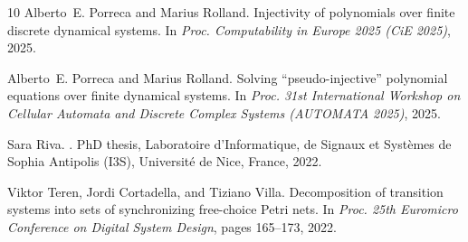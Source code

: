 \documentclass[a4paper, 11pt]{article}
\theoremstyle{plain}
\theoremstyle{definition}
\begin{document}
\begin{thebibliography}{10}
Alberto~E. Porreca and Marius Rolland.
\newblock Injectivity of polynomials over finite discrete dynamical systems.
\newblock In {\em Proc. Computability in Europe 2025 (CiE 2025)}, 2025.

Alberto~E. Porreca and Marius Rolland.
\newblock Solving “pseudo-injective” polynomial equations over finite dynamical systems.
\newblock In {\em Proc. 31st International Workshop on Cellular Automata and Discrete Complex Systems (AUTOMATA 2025)}, 2025.

Sara Riva.
.
\newblock PhD thesis, Laboratoire d’Informatique, de Signaux et Systèmes de Sophia Antipolis (I3S), Universit\'e de Nice, France, 2022.

Viktor Teren, Jordi Cortadella, and Tiziano Villa.
\newblock Decomposition of transition systems into sets of synchronizing free-choice {P}etri nets.
\newblock In {\em Proc. 25th Euromicro Conference on Digital System Design}, pages 165--173, 2022.

\end{thebibliography}
\end{document}
